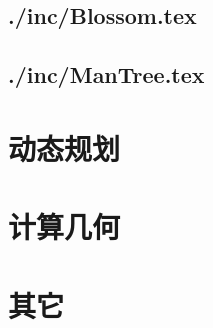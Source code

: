 \documentclass[UTF8,a4paper]{ctexart}
\begin{document}


















\subsection{./inc/Blossom.tex}

\subsection{./inc/ManTree.tex}

\section{动态规划}







\section{计算几何}











\section{其它}



\maketitle 
\end{document}
